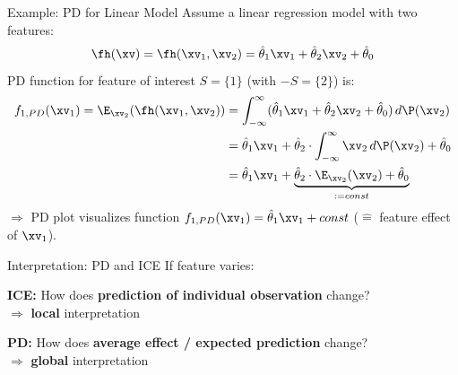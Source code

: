 \documentclass[10pt,compress,t,notes=noshow, xcolor=table]{beamer}
\begin{document}
\begin{framev}[align=top]{Example: PD for Linear Model}
Assume a linear regression model with two features:
$$\fh(\xv) = \fh(\xv_1, \xv_2) = \hat\theta_1 \xv_1 + \hat\theta_2 \xv_2 + \hat\theta_0$$
PD function for feature of interest $S = \{1\}$ (with $-S = \{2\}$) is:
$$
\begin{aligned}
f_{1, PD}(\xv_1) = \E_{\xv_2} ( \fh(\xv_1, \xv_2) ) &= \int_{-\infty}^{\infty} ( \hat\theta_1 \xv_1 + \hat\theta_2 \xv_2 + \hat\theta_0 ) \, d\P(\xv_2) \\
&= \hat\theta_1 \xv_1 + \hat\theta_2 \cdot \int_{-\infty}^{\infty} \xv_2 \, d\P(\xv_2) + \hat\theta_0 \\
&= \hat\theta_1 \xv_1 + \underbrace{\hat\theta_2 \cdot \E_{\xv_2} (\xv_2) + \hat\theta_0}_{:= const}
\end{aligned}
$$
$\Rightarrow$ PD plot visualizes function $f_{1, PD}(\xv_1) = \hat\theta_1 \xv_1 + const$ ($\hat =$ feature effect of $\xv_1$).
\end{framev}


\begin{framev}[align=top]{Interpretation: PD and ICE}
If feature varies:\\
\begin{itemizeM}
\item \textbf{ICE:} How does \textbf{prediction of individual observation} change? \\
\(\Rightarrow\) \textbf{local} interpretation
\item \textbf{PD:} How does \textbf{average effect / expected prediction} change? \\
\(\Rightarrow\) \textbf{global} interpretation
\end{itemizeM}
\end{framev}
\end{document}
